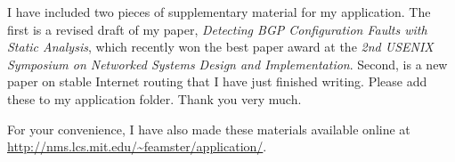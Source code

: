 
I have included two pieces of supplementary material for my application.
The first is a revised draft of my paper, {\em Detecting BGP
Configuration Faults with Static Analysis}, which recently won the best
paper award at the {\em 2nd USENIX Symposium on Networked Systems Design
and Implementation}.  Second, is a new paper on stable Internet routing
that I have just finished writing.  Please add these to my application
folder.  Thank you very much.

For your convenience, I have also made these materials available online
at \url{http://nms.lcs.mit.edu/~feamster/application/}. 

